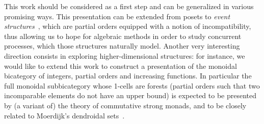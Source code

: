 \documentclass[submission,copyright,creativecommons]{eptcs}
\theoremstyle{definition}
\theoremstyle{remark}
\begin{document}
This work should be considered as a first step and can be generalized in various
promising ways. This presentation can be extended from posets to \emph{event
  structures}~\cite{winskel1995models}, which are partial orders equipped with a
notion of incompatibility, thus allowing us to hope for algebraic methods in
order to study concurrent processes, which those structures naturally
model. Another very interesting direction consists in exploring
higher-dimensional structures: for instance, we would like to extend this work
to construct a presentation of the monoidal bicategory of integers, partial
orders and increasing functions. In particular the full monoidal subbicategory
whose 1-cells are forests (\ie partial orders such that two incomparable
elements do not have an upper bound) is expected to be presented by (a variant
of) the theory of commutative strong monads, and to be closely related to
Moerdijk's dendroidal sets~\cite{moerdijk2010dendroidal}.



\end{document}
